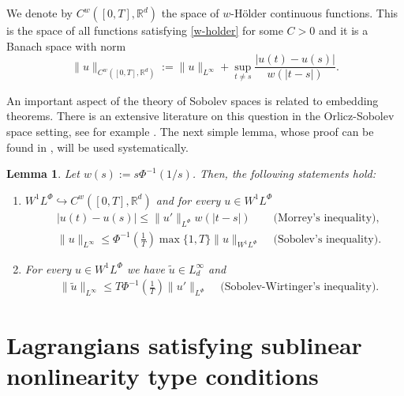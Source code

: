 \documentclass[twoside]{article}
\newtheorem{lem}[thm]{Lemma}
\theoremstyle{remark}
\newcommand{\orlnor}{\|_{L^{\Phi}}}
\newcommand{\lphi}{L^{\Phi}}
\newcommand{\wphi}{W^{1}\lphi}
\newcommand{\sobnor}{\|_{W^{1}\lphi}}
\newcommand{\rr}{\mathbb{R}}
\renewcommand{\leq}{\leqslant}
\newcounter{example}
\begin{document}
We denote by $C^w([0,T],\rr^d)$  the space of  $w$-H\"older continuous functions. This is the space of all functions satisfying \eqref{w-holder} for some $C>0$ and it is a Banach space with norm
\[\|u\|_{  C^w([0,T],\rr^d) }  :=\|u\|_{L^{\infty}}+\sup\limits_{t\neq s}\frac{|u(t)-u(s)|}{w(|t-s|)}.\]





 An important aspect of the theory of Sobolev spaces is related to embedding theorems. There is an extensive literature on this question in the  Orlicz-Sobolev space setting, see for example
 \cite{cianchi2000fully,cianchi1999some,claverooptimal,edmunds2000optimal,kerman2006optimal}.
The next simple lemma, whose proof can be found in \cite{ABGMS2015}, will be used systematically.




\begin{lem}\label{inclusion orlicz} Let  $w(s):= s\Phi^{-1}(1/s)$. Then, the following statements hold:
\begin{enumerate}
\item\label{inclusion orlicz_item1} $\wphi\hookrightarrow C^w([0,T],\rr^d) $ and for every $u\in\wphi$
\begin{align}
 &\left|u(t)-u(s) \right| \leq  \|u'\orlnor w(| t-s|)&\text{  (Morrey's inequality),}\label{in-sob-cont}
\\
& \|u\|_{L^{\infty}} \leq\Phi^{-1}\left(\frac{1}{T}\right)\max\{1,T\}\|u\sobnor&\text{  (Sobolev's inequality).}\label{sobolev}
\end{align}
\item For every $u\in\wphi$ we have $\widetilde{u}\in L^{\infty}_d$ and
\begin{align}
& \|\widetilde{u}\|_{L^{\infty}} \leq T\Phi^{-1}\left(\frac{1}{T}\right)\|u'\orlnor&
\text{  (Sobolev-Wirtinger's inequality).}\label{wirtinger}
\end{align}




\end{enumerate}
\end{lem}






\section{Lagrangians satisfying  sublinear nonlinearity type conditions}
\end{document}
